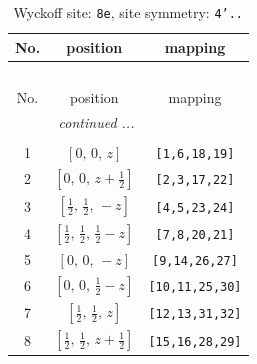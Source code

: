 \documentclass[fleqn,8pt]{jsarticle}
\begin{document}
\renewcommand{\arraystretch}{1.2}
\begin{longtable}{ccc}
\caption{Wyckoff site: {\tt 8e}, site symmetry: {\tt 4'..}}
 \\
 \hline \hline
No. & position & mapping \\ \hline \endfirsthead

\multicolumn{2}{l}{\tablename\ \thetable{}} \\
 \hline \hline
No. & position & mapping \\ \hline \endhead

 \hline \hline
\multicolumn{2}{r}{\footnotesize\it continued ...} \\ \endfoot

 \hline \hline
\multicolumn{2}{r}{} \\ \endlastfoot

1 & $\left[ 0,\, 0,\, z \right]$ & {\tt [1,6,18,19]} \\ \hline
2 & $\left[ 0,\, 0,\, z + \frac{1}{2} \right]$ & {\tt [2,3,17,22]} \\ \hline
3 & $\left[ \frac{1}{2},\, \frac{1}{2},\, - z \right]$ & {\tt [4,5,23,24]} \\ \hline
4 & $\left[ \frac{1}{2},\, \frac{1}{2},\, \frac{1}{2} - z \right]$ & {\tt [7,8,20,21]} \\ \hline
5 & $\left[ 0,\, 0,\, - z \right]$ & {\tt [9,14,26,27]} \\ \hline
6 & $\left[ 0,\, 0,\, \frac{1}{2} - z \right]$ & {\tt [10,11,25,30]} \\ \hline
7 & $\left[ \frac{1}{2},\, \frac{1}{2},\, z \right]$ & {\tt [12,13,31,32]} \\ \hline
8 & $\left[ \frac{1}{2},\, \frac{1}{2},\, z + \frac{1}{2} \right]$ & {\tt [15,16,28,29]} \\
\end{longtable}
\renewcommand{\arraystretch}{1.2}
\end{document}
